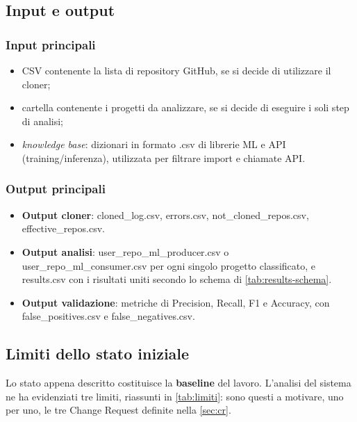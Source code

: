\documentclass[11pt,a4paper]{article}
\makeatletter
\newif\ifmark@prevlower
\def\mark@casebreak#1{%
  \ifcat\noexpand#1\relax
    \mark@prevlowerfalse
  \else
    \ifnum`#1=\uccode`#1\relax
      \ifmark@prevlower\allowbreak\fi
      \mark@prevlowerfalse
    \else
      \ifnum`#1=\lccode`#1\relax
        \mark@prevlowertrue
      \else
        \mark@prevlowerfalse
      \fi
    \fi
  \fi}
\def\mark@brk#1{%
  \ifx#1\mark@stop
    \let\mark@next\relax
  \else
    \mark@casebreak{#1}%
    #1%
    \ifx#1.\allowbreak\else
      \ifx#1\_\allowbreak\else
        \ifx#1/\allowbreak\else
          \ifx#1(\allowbreak\fi
        \fi
      \fi
    \fi
    \let\mark@next\mark@brk
  \fi
  \mark@next}
\def\mark@stop{\mark@stop}
\DeclareRobustCommand{\mark@code}[1]{%
  \ifmmode
    \text{\ttfamily\small\mark@prevlowerfalse\mark@brk#1\mark@stop}%
  \else
    {\ttfamily\small\mark@prevlowerfalse\mark@brk#1\mark@stop}%
  \fi}
\DeclareRobustCommand{\code}[1]{\mark@code{#1}}
\DeclareRobustCommand{\file}[1]{\mark@code{#1}}
\def\mark@code#1{#1}%
\def\code#1{#1}%
\def\file#1{#1}%
\makeatother
\begin{document}
\subsection{Input e output}
\label{sec:io}

\subsubsection*{Input principali}

\begin{itemize}[nosep]
  \item CSV contenente la lista di repository GitHub, se si decide di utilizzare
    il cloner;
  \item cartella contenente i progetti da analizzare, se si decide di eseguire i
    soli step di analisi;
  \item \emph{knowledge base}: dizionari in formato \code{.csv} di librerie ML e
    API (training/inferenza), utilizzata per filtrare import e chiamate API.
\end{itemize}

\subsubsection*{Output principali}

\begin{itemize}[nosep]
  \item \textbf{Output cloner}: \file{cloned\_log.csv}, \file{errors.csv},
    \file{not\_cloned\_repos.csv}, \file{effective\_repos.csv}.
  \item \textbf{Output analisi}: \file{user\_repo\_ml\_producer.csv} o
    \file{user\_repo\_ml\_consumer.csv} per ogni singolo progetto classificato,
    e \file{results.csv} con i risultati uniti secondo lo schema di
    \cref{tab:results-schema}.
  \item \textbf{Output validazione}: metriche di Precision, Recall, F1 e
    Accuracy, con \file{false\_positives.csv} e \file{false\_negatives.csv}.
\end{itemize}

\subsection{Limiti dello stato iniziale}
\label{sec:limiti}

Lo stato appena descritto costituisce la \textbf{baseline} del lavoro. L'analisi
del sistema ne ha evidenziati tre limiti, riassunti in \cref{tab:limiti}: sono
questi a motivare, uno per uno, le tre Change Request definite nella
\cref{sec:cr}.
\end{document}
